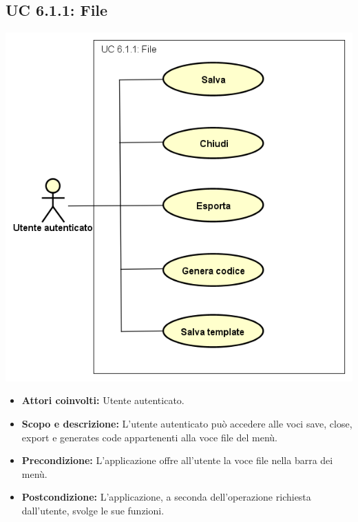 \subsection{UC 6.1.1: File}
		\includegraphics[scale=0.8]{../../Casi D'uso/UC 6.1.1.png}
\begin{itemize}
		\item \textbf{Attori coinvolti:} Utente autenticato. \\
		\item \textbf{Scopo e descrizione:} L'utente autenticato può accedere alle voci save, close, export e generates code appartenenti alla voce file del menù. \\
		\item \textbf{Precondizione:} L'applicazione offre all'utente la voce file nella barra dei menù. \\
		\item \textbf{Postcondizione:} L'applicazione, a seconda dell'operazione richiesta dall'utente, svolge le sue funzioni. \\
\end{itemize}